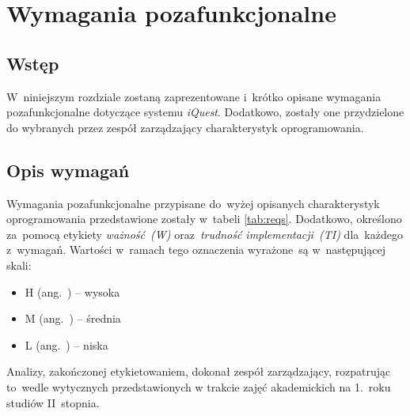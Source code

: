 \chapter{Wymagania pozafunkcjonalne}
\label{Chapter4}

\section{Wstęp}
\label{Chapter41}

W~niniejszym rozdziale zostaną zaprezentowane i~krótko opisane wymagania pozafunkcjonalne dotyczące systemu \textit{iQuest}. Dodatkowo, zostały one przydzielone do wybranych przez zespół zarządzający charakterystyk oprogramowania.

\section{Opis wymagań}
\label{Chapter42}

Wymagania pozafunkcjonalne przypisane do~wyżej opisanych charakterystyk oprogramowania przedstawione zostały w~tabeli \ref{tab:reqs}. Dodatkowo, określono za~pomocą etykiety \emph{ważność~(W)} oraz~\emph{trudność implementacji~(TI)} dla~każdego z~wymagań. Wartości w~ramach tego oznaczenia wyrażone~są w~następującej skali:

\begin{itemize}
\item{H (ang.~) -- wysoka}
\item{M (ang.~) -- średnia}
\item{L (ang.~) -- niska}
\end{itemize}

Analizy, zakończonej etykietowaniem, dokonał zespół zarządzający, rozpatrując to~wedle wytycznych przedstawionych w trakcie zajęć akademickich na 1.~roku studiów II~stopnia.

